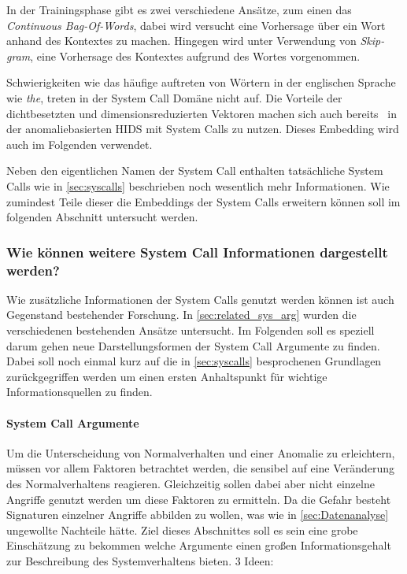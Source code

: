                 In der Trainingsphase gibt es zwei verschiedene Ansätze, zum einen das \textit{Continuous Bag-Of-Words},
                dabei wird versucht eine Vorhersage über ein Wort anhand des Kontextes zu machen.
                Hingegen wird unter Verwendung von \textit{Skip-gram}, eine Vorhersage des Kontextes aufgrund des Wortes vorgenommen.~\cite{EMBEDDINGPILEHVAR2020}

                Schwierigkeiten wie das häufige auftreten von Wörtern in der englischen Sprache wie \textit{the}, treten in der System Call Domäne nicht auf.
                Die Vorteile der dichtbesetzten und dimensionsreduzierten Vektoren machen sich auch bereits~\cite{IDSTHREADGRIMMER2021} in der anomaliebasierten \ac{HIDS} mit System Calls zu nutzen.
                Dieses Embedding wird auch im Folgenden verwendet.
                
            Neben den eigentlichen Namen der System Call enthalten tatsächliche System Calls wie in \autoref{sec:syscalls} beschrieben noch wesentlich mehr Informationen.
            Wie zumindest Teile dieser die Embeddings der System Calls erweitern können soll im folgenden Abschnitt untersucht werden.

            \subsubsection{Wie können weitere System Call Informationen dargestellt werden?}\label{sec:Meta}

                Wie zusätzliche Informationen der System Calls genutzt werden können ist auch Gegenstand bestehender Forschung.
                In \autoref{sec:related_sys_arg} wurden die verschiedenen bestehenden Ansätze untersucht.
                Im Folgenden soll es speziell darum gehen neue Darstellungsformen der System Call Argumente zu finden.
                Dabei soll noch einmal kurz auf die in \autoref{sec:syscalls} besprochenen Grundlagen zurückgegriffen werden um einen ersten Anhaltspunkt für wichtige Informationsquellen zu finden.

            \paragraph{System Call Argumente}  
                
                Um die Unterscheidung von Normalverhalten und einer Anomalie zu erleichtern, müssen vor allem Faktoren betrachtet werden, die sensibel auf eine Veränderung des Normalverhaltens reagieren.
                Gleichzeitig sollen dabei aber nicht einzelne Angriffe genutzt werden um diese Faktoren zu ermitteln.
                Da die Gefahr besteht Signaturen einzelner Angriffe abbilden zu wollen, was wie in \autoref{sec:Datenanalyse} ungewollte Nachteile hätte.
                Ziel dieses Abschnittes soll es sein eine grobe Einschätzung zu bekommen welche Argumente einen großen Informationsgehalt zur Beschreibung des Systemverhaltens bieten.
                3 Ideen:

